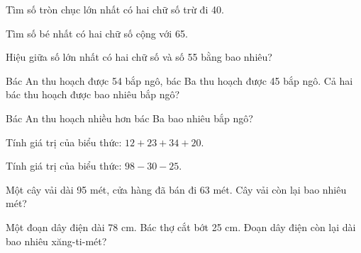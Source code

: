 \begin{ex}
Tìm số tròn chục lớn nhất có hai chữ số trừ đi 40.
\end{ex}

\begin{ex}
Tìm số bé nhất có hai chữ số cộng với 65.
\end{ex}

\begin{ex}
Hiệu giữa số lớn nhất có hai chữ số và số 55 bằng bao nhiêu?
\end{ex}

\begin{ex}
Bác An thu hoạch được 54 bắp ngô, bác Ba thu hoạch được 45 bắp ngô. Cả hai bác thu hoạch được bao nhiêu bắp ngô?
\end{ex}

\begin{ex}
Bác An thu hoạch nhiều hơn bác Ba bao nhiêu bắp ngô?
\end{ex}

\begin{ex}
Tính giá trị của biểu thức: $12 + 23 + 34 + 20$.
\end{ex}

\begin{ex}
Tính giá trị của biểu thức: $98 - 30 - 25$.
\end{ex}

\begin{ex}
Một cây vải dài 95 mét, cửa hàng đã bán đi 63 mét. Cây vải còn lại bao nhiêu mét?
\end{ex}

\begin{ex}
Một đoạn dây điện dài 78 cm. Bác thợ cắt bớt 25 cm. Đoạn dây điện còn lại dài bao nhiêu xăng-ti-mét?
\end{ex}

